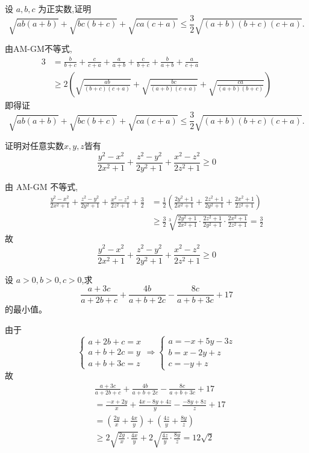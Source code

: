 \begin{questions}
    \question 设 $a,b,c$ 为正实数,证明
    \[
    \sqrt{ab(a+b)} + \sqrt{bc(b+c)} + \sqrt{ca(c+a)} \le \frac{3}{2}\sqrt{(a+b)(b+c)(c+a)}.
    \]
    \begin{solution}
        由AM-GM不等式,
        \begin{align*}
        3&=\frac{b}{b+c} + \frac{c}{c+a} + \frac{a}{a+b} + \frac{c}{b+c} + \frac{b}{a+b} + \frac{a}{c+a} \\
        &\ge 2\left(\sqrt{\frac{ab}{(b+c)(c+a)}} + \sqrt{\frac{bc}{(a+b)(c+a)}} + \sqrt{\frac{ca}{(a+b)(b+c)}}\right)
        \end{align*}
        即得证
        \[
        \sqrt{ab(a+b)} + \sqrt{bc(b+c)} + \sqrt{ca(c+a)} \le \frac{3}{2}\sqrt{(a+b)(b+c)(c+a)}.
        \]
    \end{solution}

    \question 证明对任意实数$x, y, z$皆有 $$ \frac{y^{2}-x^{2}}{2x^{2}+1}+\frac{z^{2}-y^{2}}{2y^{2}+1}+\frac{x^{2}-z^{2}}{2z^{2}+1}\ge0 $$
    \begin{solution}
        由 AM-GM 不等式,
        \begin{align*}
            \frac{y^{2}-x^{2}}{2x^{2}+1}+\frac{z^{2}-y^{2}}{2y^{2}+1}+\frac{x^{2}-z^{2}}{2z^{2}+1}+\frac{3}{2}
            &=\frac{1}{2}\left(\frac{2y^{2}+1}{2x^{2}+1}+\frac{2z^{2}+1}{2y^{2}+1}+\frac{2x^{2}+1}{2z^{2}+1}\right) \\
            &\ge\frac{3}{2}\sqrt[3]{\frac{2y^{2}+1}{2x^{2}+1}\cdot \frac{2z^{2}+1}{2y^{2}+1}\cdot\frac{2x^{2}+1}{2z^{2}+1}}  =\frac{3}{2}
        \end{align*}
        故
        $$ \frac{y^{2}-x^{2}}{2x^{2}+1}+\frac{z^{2}-y^{2}}{2y^{2}+1}+\frac{x^{2}-z^{2}}{2z^{2}+1}\ge0 $$
    \end{solution}
    
    \question 设 $a>0, b>0, c>0$,求
    \[
    \frac{a+3c}{a+2b+c} + \frac{4b}{a+b+2c} - \frac{8c}{a+b+3c} + 17
    \]
    的最小值。
    \begin{solution}
        由于
        \[
        \begin{cases}
        a + 2b + c = x\\ a + b + 2c = y\\ a + b + 3c = z
        \end{cases}
        \Rightarrow
        \begin{cases}
        a = -x + 5y - 3z \\ b = x - 2y + z \\ c = -y + z
        \end{cases}
        \]
        故
        \begin{align*}
        &\frac{a+3c}{a+2b+c} + \frac{4b}{a+b+2c} - \frac{8c}{a+b+3c} + 17 \\[1mm]
        &= \frac{-x + 2y}{x} + \frac{4x - 8y + 4z}{y} - \frac{-8y + 8z}{z} + 17 \\
        &= \left(\frac{2y}{x} + \frac{4x}{y}\right) + \left(\frac{4z}{y} + \frac{8y}{z}\right) \\[1mm]
        &\geq 2\sqrt{\frac{2y}{x} \cdot \frac{4x}{y}} + 2\sqrt{\frac{4z}{y} \cdot \frac{8y}{z}} = 12\sqrt{2}
        \end{align*}
    \end{solution}


\end{questions}
